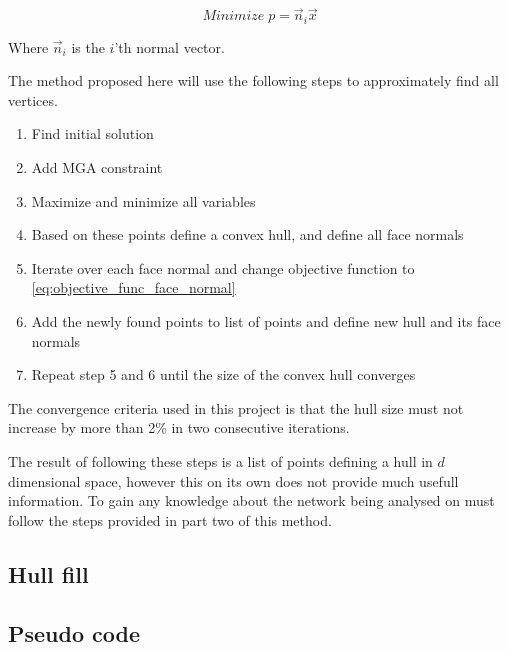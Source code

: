 \begin{equation}\label{eq:objective_func_face_normal}
Minimize \; p = \vec{n}_i\vec{x}
\end{equation}

Where $\vec{n}_i$ is the $i$'th normal vector. 


The method proposed here will use the following steps to approximately find all vertices. 

\begin{enumerate}
	\item Find initial solution
	\item Add MGA constraint
	\item Maximize and minimize all variables
	\item Based on these points define a convex hull, and define all face normals
	\item Iterate over each face normal and change objective function to \vref{eq:objective_func_face_normal}
	\item Add the newly found points to list of points and define new hull and its face normals 
	\item Repeat step 5 and 6 until the size of the convex hull converges 
\end{enumerate}

The convergence criteria used in this project is that the hull size must not increase by more than 2\% in two consecutive iterations. 

The result of following these steps is a list of points defining a hull in $d$ dimensional space, however this on its own does not provide much usefull information. To gain any knowledge about the network being analysed on must follow the steps provided in part two of this method. 

\subsection{Hull fill}










\subsection{Pseudo code}

